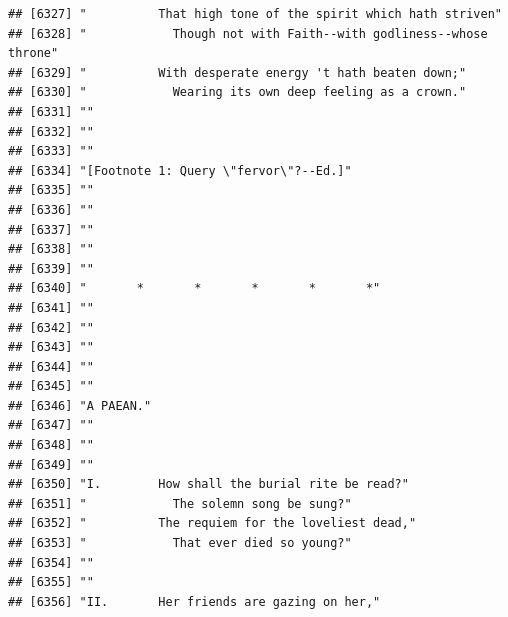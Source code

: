 \documentclass{article}\usepackage[]{graphicx}\usepackage[]{color}
\makeatletter
\newenvironment{kframe}{%
 \def\at@end@of@kframe{}%
 \ifinner\ifhmode%
  \def\at@end@of@kframe{\end{minipage}}%
  \begin{minipage}{\columnwidth}%
 \fi\fi%
 \def\FrameCommand##1{\hskip\@totalleftmargin \hskip-\fboxsep
 \colorbox{shadecolor}{##1}\hskip-\fboxsep
     \hskip-\linewidth \hskip-\@totalleftmargin \hskip\columnwidth}%
 \MakeFramed {\advance\hsize-\width
   \@totalleftmargin\z@ \linewidth\hsize
   \@setminipage}}%
 {\par\unskip\endMakeFramed%
 \at@end@of@kframe}
\newenvironment{knitrout}{}{} %
\makeatother
\begin{document}
\begin{knitrout}
\begin{kframe}
\begin{verbatim}
## [6327] "          That high tone of the spirit which hath striven"                   
## [6328] "            Though not with Faith--with godliness--whose throne"             
## [6329] "          With desperate energy 't hath beaten down;"                        
## [6330] "            Wearing its own deep feeling as a crown."                        
## [6331] ""                                                                            
## [6332] ""                                                                            
## [6333] ""                                                                            
## [6334] "[Footnote 1: Query \"fervor\"?--Ed.]"                                        
## [6335] ""                                                                            
## [6336] ""                                                                            
## [6337] ""                                                                            
## [6338] ""                                                                            
## [6339] ""                                                                            
## [6340] "       *       *       *       *       *"                                    
## [6341] ""                                                                            
## [6342] ""                                                                            
## [6343] ""                                                                            
## [6344] ""                                                                            
## [6345] ""                                                                            
## [6346] "A PAEAN."                                                                    
## [6347] ""                                                                            
## [6348] ""                                                                            
## [6349] ""                                                                            
## [6350] "I.        How shall the burial rite be read?"                                
## [6351] "            The solemn song be sung?"                                        
## [6352] "          The requiem for the loveliest dead,"                               
## [6353] "            That ever died so young?"                                        
## [6354] ""                                                                            
## [6355] ""                                                                            
## [6356] "II.       Her friends are gazing on her,"                                    

\end{verbatim}
\end{kframe}
\end{knitrout}
\end{document}
